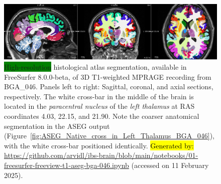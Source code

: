 \documentclass[diagnostics,article,accept,pdftex,moreauthors]{Definitions/mdpi}
\newcommand{\highlight}[1]{\colorbox{green}{#1}}
\begin{document}
\begin{figure}[H]
\includegraphics[width=1\textwidth]{figs/Histo_atlas_segentation_fs8_BGA_046.png}
\caption{{{\highlight{High-resolution} %
 histological atlas segmentation, available in FreeSurfer 8.0.0-beta, of 3D T1-weighted MPRAGE recording from BGA\_046}}. {Panels left to right:} Sagittal, coronal, and axial sections, respectively. The white cross-bar in the middle of the brain is located in the \textit{paracentral nucleus} of the \textit{left thalamus} at RAS coordinates 4.03, 22.15, and 21.90. 
Note the coarser anatomical segmentation in the ASEG output (Figure~\ref{fig:ASEG_Native_cross_in_Left_Thalamus_BGA_046}), with the white cross-bar positioned identically. 
{\hl{Generated by:} {{\url{https://github.com/arvidl/ibs-brain/blob/main/notebooks/01-freesurfer-freeview-t1-aseg-bga-046.ipynb}}}} (accessed on 11 February 2025).}
\label{fig:Histo_atlas_segentation_fs8_BGA_046}
\end{figure}
\end{document}
